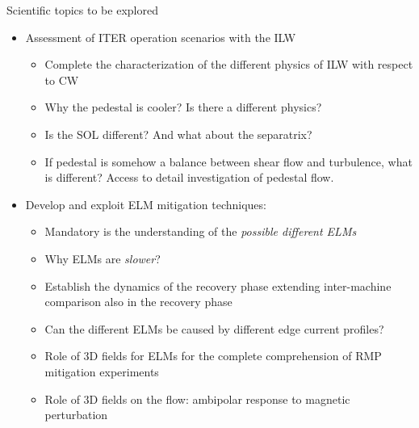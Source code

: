 \documentclass[t,10pt]{beamer}
\begin{document}
\begin{frame}{Scientific topics to be explored}
\begin{itemize}
\item Assessment of ITER operation scenarios with the ILW
  \begin{itemize}
    \item Complete the characterization of the different physics of ILW with respect to CW
     \item Why the pedestal is cooler? Is there a different physics?
    \item Is the SOL different? And what about the separatrix?
    \item If pedestal is
    somehow a balance between shear flow and turbulence, what is different? Access to detail investigation
    of pedestal flow.
  \end{itemize}
\item Develop and exploit ELM mitigation techniques:
\begin{itemize}
 \item Mandatory is the understanding of the \emph{possible different ELMs}
 \item Why ELMs are \emph{slower}?
 \item Establish the dynamics of the recovery phase
   extending inter-machine comparison also in the recovery phase
 \item Can the different ELMs be caused by different edge current profiles?
 \item Role of 3D fields for ELMs for the complete comprehension of RMP mitigation experiments
 \item Role of 3D fields on the flow: ambipolar response to magnetic perturbation 
   
\end{itemize}


\end{itemize}
\end{frame}
\end{document}
